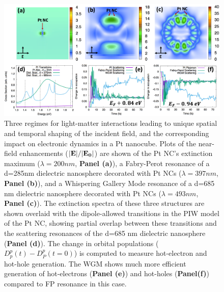 \documentclass[journal=jpclcd,manuscript=letter]{achemso}
\begin{document}
\begin{figure}
\begin{center}
\includegraphics[width=6in]{figs/Pt_AllThree_Alternate.png}
\caption{Three regimes for light-matter interactions leading to unique
spatial and temporal shaping of the incident field, and the corresponding
impact on electronic dynamics in a Pt nanocube. Plots of the near-field enhancements (${\bf |E|}/{\bf |E_0|}$) are shown of the
Pt NC's extinction maximum ($\lambda=200 nm$, {\bf Panel (a)}), a Fabry-Perot resonance of a d=285nm dielectric nanosphere decorated with Pt NCs
($\lambda = 397 nm$, {\bf Panel (b)}),
and a Whispering Gallery Mode resonance of a d=685 nm dielectric nanosphere decorated with Pt NCs ($\lambda = 493 nm$, {\bf Panel (c)}).
The extinction spectra of these three structures are shown overlaid with the dipole-allowed transitions in the PIW model of the Pt NC, showing partial
overlap between these transitions and the scattering resonances of the d=685 nm dielectric nanosphere ({\bf Panel (d)}).
The change in orbital populations ($D_p^p(t)-D_P^p(t=0)$) is computed to measure hot-electron and hot-hole generation.
The WGM shows much more efficient generation of hot-electrons ({\bf Panel (e)}) and hot-holes ({\bf Panel(f)}) compared to FP resonance in this case.}
\end{center}
\end{figure}
\end{document}
